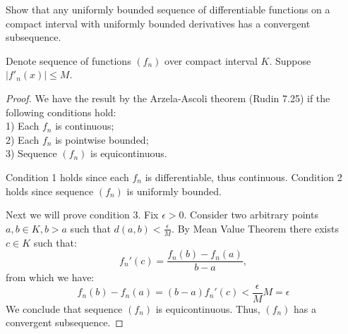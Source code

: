 \documentclass{article}
\begin{document}
\begin{tcolorbox}
Show that any uniformly bounded sequence of differentiable functions on a compact interval with uniformly bounded derivatives has a convergent subsequence.
\end{tcolorbox}

Denote sequence of functions $(f_n)$ over compact interval $K$. Suppose $|f'_n(x)| \leq M$.

\begin{proof}

We have the result by the Arzela-Ascoli theorem (Rudin 7.25) if the following conditions hold:\\
1) Each $f_n$ is continuous;\\
2) Each $f_n$ is pointwise bounded;\\
3) Sequence $(f_n)$ is equicontinuous.

Condition 1 holds since each $f_n$ is differentiable, thus continuous. Condition 2 holds since sequence $(f_n)$ is uniformly bounded.

Next we will prove condition 3. Fix $\epsilon>0$. Consider two arbitrary points $a,b \in K, b > a$ such that $d(a,b) < \frac{\epsilon}{M}$. By Mean Value Theorem there exists $c \in K$ such that:
\[ f_n'(c) = \frac{f_n(b) - f_n(a)}{b - a}, \]
from which we have:
\[ f_n(b) - f_n(a) = (b - a) f_n'(c) < \frac{\epsilon}{M} M = \epsilon \]
We conclude that sequence $(f_n)$ is equicontinuous. Thus, $(f_n)$ has a convergent subsequence.

\end{proof}
\end{document}
